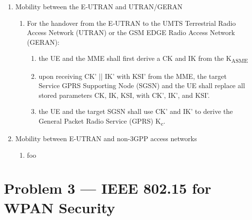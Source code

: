 \documentclass[a4paper]{report}
\makeatletter
\DeclareRobustCommand{\textsupsub}[2]{{%
  \m@th\ensuremath{%
    ^{\mbox{\fontsize\sf@size\z@#1}}%
    _{\mbox{\fontsize\sf@size\z@#2}}%
  }%
}}
\makeatother
\begin{document}
\begin{enumerate}
\begin{enumerate}
\begin{enumerate}
                 which is derived by the UE and the MME after an initial access authentication.
        \item In the initial setup, K\textsubscript{eNB} is derived directly from the K\textsubscript{ASME}, and is then associated with a
                 virtual NH parameter with a NH chaining counter (NCC)  value to be zero. The UE and the eNB
                 use the K\textsubscript{eNB} to secure the communication on the air interface.
        \item In handovers, a new session key used between the UE and the target eNB, K\textsupsub{*}{eNB},
                 is derived from either the active K\textsubscript{eNB} or from the NH parameter.
        \end{enumerate}
    \item Mobility between the E-UTRAN and UTRAN/GERAN
        \begin{enumerate}
        \item For the handover from the E-UTRAN to the UMTS Terrestrial Radio Access Network (UTRAN) or the
                 GSM EDGE Radio Access Network (GERAN):
            \begin{enumerate}
            \item the UE and the MME shall first derive a CK and IK from the K\textsubscript{ASME}
            \item upon receiving CK' || IK' with KSI' from the MME, the target Service GPRS Supporting Node (SGSN) and
                     the UE shall replace all stored parameters CK, IK, KSI, with CK', IK', and KSI'.
            \item the UE and the target SGSN shall use CK' and IK' to derive the General Packet Radio Service (GPRS)
                     K\textsubscript{c}.
            \end{enumerate}
        \end{enumerate}
    \item Mobility between E-UTRAN and non-3GPP access networks
        \begin{enumerate}
        \item foo
        \end{enumerate}
    \end{enumerate}
\end{enumerate}

\section{Problem 3 --- IEEE 802.15 for WPAN Security}
\end{document}
